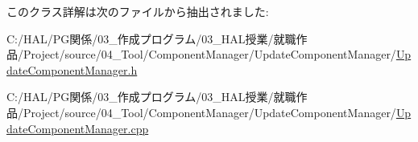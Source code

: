このクラス詳解は次のファイルから抽出されました\+:\begin{DoxyCompactItemize}
\item 
C\+:/\+H\+A\+L/\+P\+G関係/03\+\_\+作成プログラム/03\+\_\+\+H\+A\+L授業/就職作品/\+Project/source/04\+\_\+\+Tool/\+Component\+Manager/\+Update\+Component\+Manager/\mbox{\hyperlink{_update_component_manager_8h}{Update\+Component\+Manager.\+h}}\item 
C\+:/\+H\+A\+L/\+P\+G関係/03\+\_\+作成プログラム/03\+\_\+\+H\+A\+L授業/就職作品/\+Project/source/04\+\_\+\+Tool/\+Component\+Manager/\+Update\+Component\+Manager/\mbox{\hyperlink{_update_component_manager_8cpp}{Update\+Component\+Manager.\+cpp}}\end{DoxyCompactItemize}
